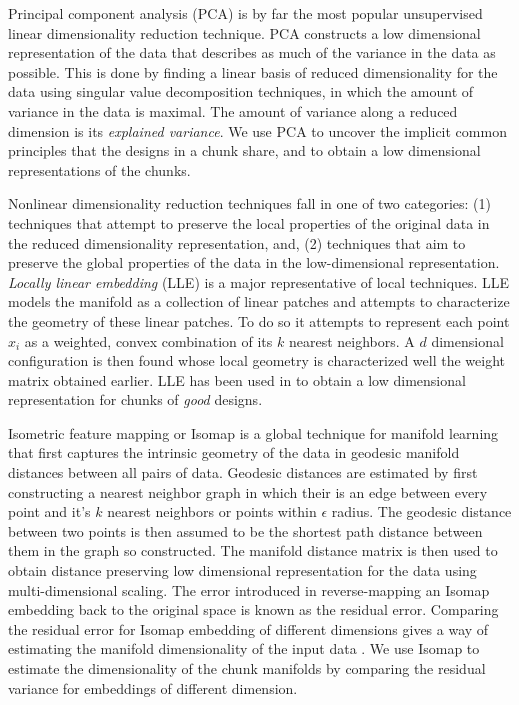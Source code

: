 Principal component analysis (PCA) \citep{hotelling33, jolliffe02}is by far
the most popular unsupervised linear dimensionality reduction technique.
PCA constructs a low dimensional representation of the data that describes
as much of the variance in the data as possible. This is done by finding a
linear basis of reduced dimensionality for the data using singular value
decomposition techniques, in which the amount of variance in the data is
maximal. The amount of variance along a reduced dimension is its {\em
  explained variance}. We use PCA to uncover the implicit common principles
that the designs in a chunk share, and to obtain a low dimensional
representations of the chunks.

Nonlinear dimensionality reduction techniques fall in one of two
categories: (1) techniques that attempt to preserve the local properties of
the original data in the reduced dimensionality representation, and, (2)
techniques that aim to preserve the global properties of the data in the
low-dimensional representation. {\em Locally linear embedding} (LLE)
\citep{saul03} is a major representative of local techniques. LLE models
the manifold as a collection of linear patches and attempts to characterize
the geometry of these linear patches. To do so it attempts to represent
each point $x_i$ as a weighted, convex combination of its $k$ nearest
neighbors. A $d$ dimensional configuration is then found whose local
geometry is characterized well the weight matrix obtained earlier. LLE has
been used in \citep{mukerjee09} to obtain a low dimensional representation
for chunks of {\em good} designs.

Isometric feature mapping or Isomap \citep{tsl05} is a global technique for
manifold learning that first captures the intrinsic geometry of the data in
geodesic manifold distances between all pairs of data. Geodesic distances
are estimated by first constructing a nearest neighbor graph in which their
is an edge between every point and it's $k$ nearest neighbors or points
within $\epsilon$ radius. The geodesic distance between two points is then
assumed to be the shortest path distance between them in the graph so
constructed. The manifold distance matrix is then used to obtain distance
preserving low dimensional representation for the data using
multi-dimensional scaling. The error introduced in reverse-mapping an
Isomap embedding back to the original space is known as the residual
error. Comparing the residual error for Isomap embedding of different
dimensions gives a way of estimating the manifold dimensionality of the
input data \citep{martin05}. We use Isomap to estimate the dimensionality
of the chunk manifolds by comparing the residual variance for embeddings of
different dimension.

